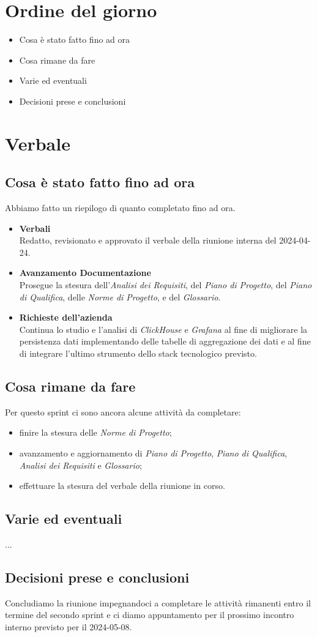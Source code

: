 \documentclass[italian,12pt]{article}
\begin{document}
\section{Ordine del giorno}
\begin{itemize}
	\item Cosa è stato fatto fino ad ora
	\item Cosa rimane da fare
	\item Varie ed eventuali
	\item Decisioni prese e conclusioni
\end{itemize}

\newpage

\section{Verbale}

\subsection{Cosa è stato fatto fino ad ora}
Abbiamo fatto un riepilogo di quanto completato fino ad ora.
\begin{itemize}
	\item \textbf{Verbali} \\
	Redatto, revisionato e approvato il verbale della riunione interna del 2024-04-24.
	\item \textbf{Avanzamento Documentazione} \\
	Prosegue la stesura dell'\textit{Analisi dei Requisiti}, del \textit{Piano di Progetto}, del \textit{Piano di Qualifica}, delle \textit{Norme di Progetto}, e del 
	\textit{Glossario}.
	\item \textbf{Richieste dell'azienda} \\
	Continua lo studio e l'analisi di \textit{ClickHouse} e \textit{Grafana} al fine di migliorare la persistenza dati implementando delle tabelle di aggregazione dei dati e al fine di integrare l'ultimo strumento dello stack tecnologico previsto. \\
\end{itemize}

\subsection{Cosa rimane da fare}
Per questo sprint ci sono ancora alcune attività da completare:
\begin{itemize}
	\item finire la stesura delle \textit{Norme di Progetto};
	\item avanzamento e aggiornamento di \textit{Piano di Progetto}, \textit{Piano di Qualifica}, \textit{Analisi dei Requisiti} e \textit{Glossario};
	\item effettuare la stesura del verbale della riunione in corso.
\end{itemize}

\subsection{Varie ed eventuali}
...

\subsection{Decisioni prese e conclusioni}
Concludiamo la riunione impegnandoci a completare le attività rimanenti entro il termine del secondo sprint e ci diamo appuntamento per il prossimo incontro interno previsto per il 2024-05-08.
\end{document}
